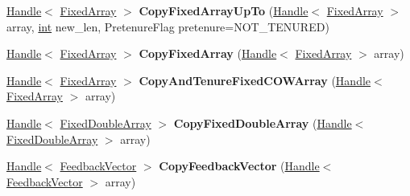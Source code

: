 \begin{DoxyCompactItemize}
\item 
\mbox{\label{classv8_1_1internal_1_1Factory_a8dbd608f82a5d4175391c530dc8a9196}} 
\mbox{\hyperlink{classv8_1_1internal_1_1Handle}{Handle}}$<$ \mbox{\hyperlink{classv8_1_1internal_1_1FixedArray}{Fixed\+Array}} $>$ {\bfseries Copy\+Fixed\+Array\+Up\+To} (\mbox{\hyperlink{classv8_1_1internal_1_1Handle}{Handle}}$<$ \mbox{\hyperlink{classv8_1_1internal_1_1FixedArray}{Fixed\+Array}} $>$ array, \mbox{\hyperlink{classint}{int}} new\+\_\+len, Pretenure\+Flag pretenure=N\+O\+T\+\_\+\+T\+E\+N\+U\+R\+ED)
\item 
\mbox{\label{classv8_1_1internal_1_1Factory_a05d1e0e5e666425c40f1f5c82194b648}} 
\mbox{\hyperlink{classv8_1_1internal_1_1Handle}{Handle}}$<$ \mbox{\hyperlink{classv8_1_1internal_1_1FixedArray}{Fixed\+Array}} $>$ {\bfseries Copy\+Fixed\+Array} (\mbox{\hyperlink{classv8_1_1internal_1_1Handle}{Handle}}$<$ \mbox{\hyperlink{classv8_1_1internal_1_1FixedArray}{Fixed\+Array}} $>$ array)
\item 
\mbox{\label{classv8_1_1internal_1_1Factory_a025ec998267765e7806ba3bcb90ad1d5}} 
\mbox{\hyperlink{classv8_1_1internal_1_1Handle}{Handle}}$<$ \mbox{\hyperlink{classv8_1_1internal_1_1FixedArray}{Fixed\+Array}} $>$ {\bfseries Copy\+And\+Tenure\+Fixed\+C\+O\+W\+Array} (\mbox{\hyperlink{classv8_1_1internal_1_1Handle}{Handle}}$<$ \mbox{\hyperlink{classv8_1_1internal_1_1FixedArray}{Fixed\+Array}} $>$ array)
\item 
\mbox{\label{classv8_1_1internal_1_1Factory_a4cdff7683e9549a6e4ac2666ec0aeca8}} 
\mbox{\hyperlink{classv8_1_1internal_1_1Handle}{Handle}}$<$ \mbox{\hyperlink{classv8_1_1internal_1_1FixedDoubleArray}{Fixed\+Double\+Array}} $>$ {\bfseries Copy\+Fixed\+Double\+Array} (\mbox{\hyperlink{classv8_1_1internal_1_1Handle}{Handle}}$<$ \mbox{\hyperlink{classv8_1_1internal_1_1FixedDoubleArray}{Fixed\+Double\+Array}} $>$ array)
\item 
\mbox{\label{classv8_1_1internal_1_1Factory_a8850c78fd71efe92a024f405d097f4d1}} 
\mbox{\hyperlink{classv8_1_1internal_1_1Handle}{Handle}}$<$ \mbox{\hyperlink{classv8_1_1internal_1_1FeedbackVector}{Feedback\+Vector}} $>$ {\bfseries Copy\+Feedback\+Vector} (\mbox{\hyperlink{classv8_1_1internal_1_1Handle}{Handle}}$<$ \mbox{\hyperlink{classv8_1_1internal_1_1FeedbackVector}{Feedback\+Vector}} $>$ array)

\end{DoxyCompactItemize}
